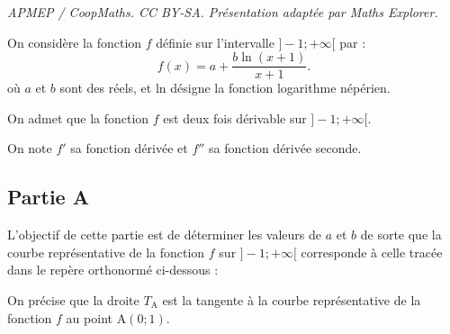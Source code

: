 \documentclass[10pt]{article}
\begin{document}
\noindent\textit{APMEP / CoopMaths. CC BY-SA. Présentation adaptée par Maths Explorer.}\par\medskip
On considère la fonction $f$ définie sur l'intervalle $]-1 ;+\infty[$ par :
	\[f(x)=a+\dfrac{b \ln (x+1)}{x+1}.\]
	où $a$ et $b$ sont des réels, et ln désigne la fonction logarithme népérien.

	On admet que la fonction $f$ est deux fois dérivable sur $]-1 ; +\infty [$.

	On note $f'$ sa fonction dérivée et $f''$ sa fonction dérivée seconde.

	\subsection*{Partie A}
	L'objectif de cette partie est de déterminer les valeurs de $a$ et $b$ de sorte que la courbe représentative de la fonction $f$ sur $]-1 ;+\infty[$ 
	corresponde à celle tracée dans le repère orthonormé ci-dessous :

	\begin{center}
		













	\end{center}


	On précise que la droite $T_{\mathrm{A}}$ est la tangente à la courbe représentative de la fonction $f$ au point A$(0 ; 1)$.
\end{document}
